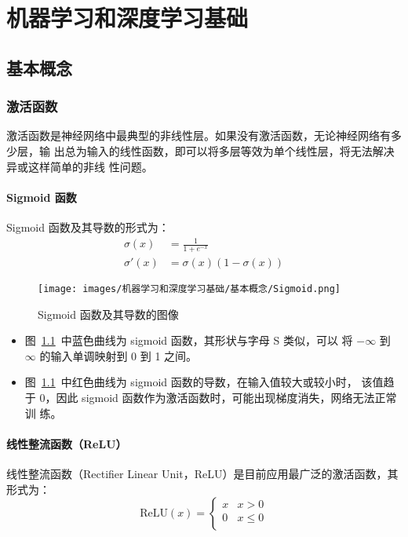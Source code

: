 \part{机器学习和深度学习基础}

\chapter{基本概念}

\section{激活函数}

激活函数是神经网络中最典型的非线性层。如果没有激活函数，无论神经网络有多少层，输
出总为输入的线性函数，即可以将多层等效为单个线性层，将无法解决异或这样简单的非线
性问题。

\subsection{Sigmoid 函数}\label{subsec:Sigmoid}

Sigmoid 函数及其导数的形式为：
\begin{align}
  \label{equ:sigmoid}
  \sigma(x) & = \frac{1}{1 + e^{-x}} \\
  \label{equ:sigmoid-d}
  \sigma'(x) & = \sigma(x) (1-\sigma(x))
\end{align}

\begin{figure}[ht]
  \centering
  \texttt{[image: images/机器学习和深度学习基础/基本概念/Sigmoid.png]}
  \caption{Sigmoid 函数及其导数的图像}\label{fig:sigmoid}
\end{figure}

\begin{itemize}
  \item 图~\ref{fig:sigmoid}~中蓝色曲线为 sigmoid 函数，其形状与字母 S 类似，可以
    将 $-\infty$ 到 $\infty$ 的输入单调映射到 0 到 1 之间。
  \item 图~\ref{fig:sigmoid}~中红色曲线为 sigmoid 函数的导数，在输入值较大或较小时，
    该值趋于 0，因此 sigmoid 函数作为激活函数时，可能出现梯度消失，网络无法正常训
    练。
\end{itemize}

\subsection{线性整流函数（ReLU）}

线性整流函数（Rectifier Linear Unit，ReLU）是目前应用最广泛的激活函数，其形式为：
\begin{equation}
  \label{equ:ReLU}
  \mathrm{ReLU}(x) = \left\{
    \begin{array}{lr}
      x & x > 0 \\
      0 & x \leq 0 \\
    \end{array}
  \right.
\end{equation}

